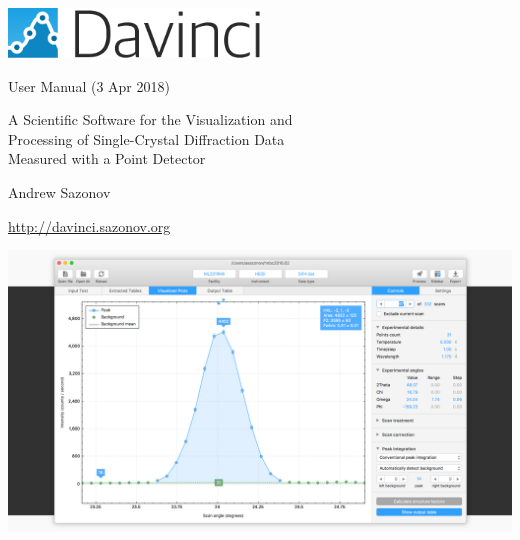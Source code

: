 \pagecolor{bgr}
\begin{titlepage}

\newcommand\tspace{\vspace*{1.7em}}

\centering

\tspace

\includegraphics[width=0.5\textwidth]{images/davinci-logo.pdf}

{\Large User Manual (3 Apr 2018)\par}

\tspace

{\LARGE A Scientific Software for the Visualization and\\ Processing of Single-Crystal Diffraction Data\\ Measured with a Point Detector\par}

\tspace

{\Large Andrew Sazonov\par}
{\Large \url{http://davinci.sazonov.org}}

\tspace

\hspace*{-2cm}\includegraphics[width=\paperwidth]{images/cover_image.png}

\vfill

\end{titlepage}
\pagecolor{white}




